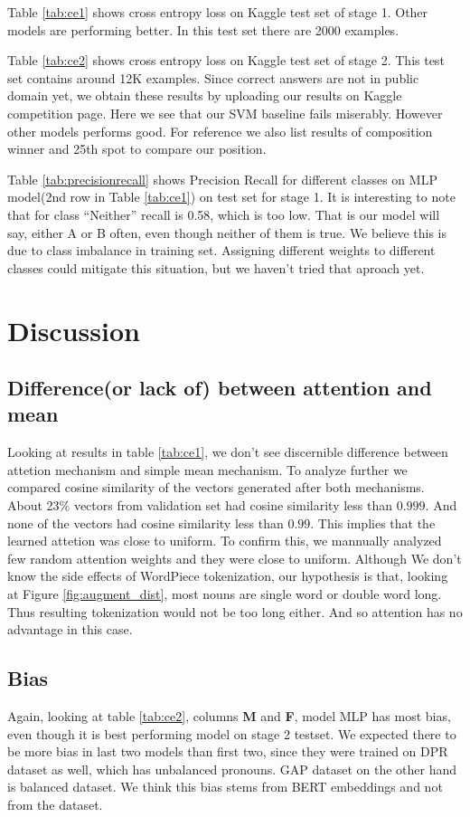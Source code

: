 \documentclass[11pt,a4paper]{article}
\begin{document}
Table \ref{tab:ce1} shows cross entropy loss on Kaggle test set of stage 1.  Other models are performing better. In this test set there are 2000 examples.

Table \ref{tab:ce2} shows cross entropy loss on Kaggle test set of stage 2. This test set contains around 12K examples. Since correct answers are not in public domain yet, we obtain these results by uploading our results on Kaggle competition page. Here we see that our SVM baseline fails miserably. However other models performs good. For reference we also list results of composition winner and 25th spot to compare our position.

Table \ref{tab:precisionrecall} shows Precision Recall for different classes on MLP model(2nd row in Table \ref{tab:ce1}) on test set for stage 1. It is interesting to note that for class ``Neither'' recall is 0.58, which is too low. That is our model will say, either A or B often, even though neither of them is true. We believe this is due to class imbalance in training set. Assigning different weights to different classes could mitigate this situation, but we haven't tried that aproach yet.

\section{Discussion}
\label{sec:discussion}

\subsection{Difference(or lack of) between attention and mean}
Looking at results in table \ref{tab:ce1}, we don't see discernible difference between attetion mechanism and simple mean mechanism. To analyze further we compared cosine similarity of the vectors generated after both mechanisms. About 23\% vectors from validation set had cosine similarity less than $0.999$. And none of the vectors had cosine similarity less than $0.99$. This implies that the learned attetion was close to uniform. To confirm this,  we mannually analyzed few random attention weights and they were close to uniform. Although We don't know the side effects of WordPiece tokenization, our hypothesis is that, looking at Figure \ref{fig:augment_dist}, most nouns are single word or double word long. Thus resulting tokenization would not be too long either. And so attention has no advantage in this case.

\subsection{Bias}
\label{sec:bias}
Again, looking at table \ref{tab:ce2}, columns \textbf{M} and \textbf{F}, model MLP has most bias, even though it is best performing model on stage 2 testset. We expected there to be more bias in last two models than first two, since they were trained on DPR dataset as well, which has unbalanced pronouns. GAP dataset on the other hand is balanced dataset. We think this bias stems from BERT embeddings and not from the dataset.
\end{document}
